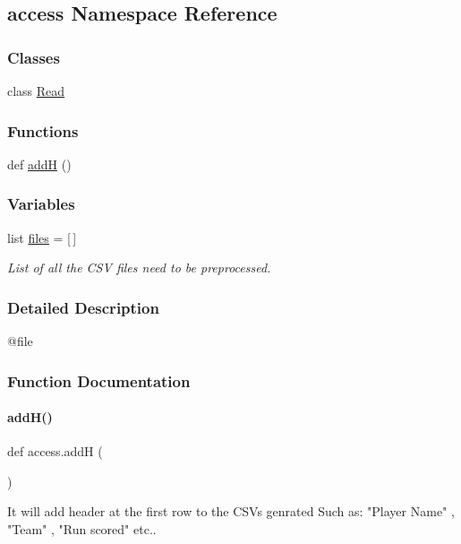 \hypertarget{namespaceaccess}{}\subsection{access Namespace Reference}
\label{namespaceaccess}
\subsubsection*{Classes}
\begin{DoxyCompactItemize}
\item 
class \hyperlink{classaccess_1_1Read}{Read}
\end{DoxyCompactItemize}
\subsubsection*{Functions}
\begin{DoxyCompactItemize}
\item 
def \hyperlink{namespaceaccess_a183ae43f0e30d2b6f0d9c7b150afbf84}{addH} ()
\end{DoxyCompactItemize}
\subsubsection*{Variables}
\begin{DoxyCompactItemize}
\item 
\mbox{\label{namespaceaccess_afd9f62f0198063032760b0959d3c7b5d}} 
list \hyperlink{namespaceaccess_afd9f62f0198063032760b0959d3c7b5d}{files} = \mbox{[}$\,$\mbox{]}
\begin{DoxyCompactList}\small\item\em List of all the C\+SV files need to be preprocessed. \end{DoxyCompactList}\end{DoxyCompactItemize}


\subsubsection{Detailed Description}
\begin{DoxyVerb}@file 
\end{DoxyVerb}
 

\subsubsection{Function Documentation}
\mbox{\label{namespaceaccess_a183ae43f0e30d2b6f0d9c7b150afbf84}} 
\paragraph{\texorpdfstring{add\+H()}{addH()}}
{\footnotesize\ttfamily def access.\+addH (\begin{DoxyParamCaption}{ }\end{DoxyParamCaption})}

\begin{DoxyVerb}It will add header at the first row to the CSVs genrated
Such as: "Player Name" , "Team" , "Run scored" etc..    
\end{DoxyVerb}
 